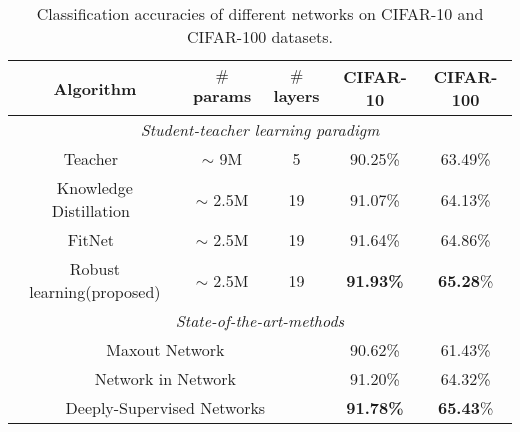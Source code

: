 \documentclass[journal]{IEEEtran}
\begin{document}
\begin{table*}[ht]
\renewcommand\arraystretch{1}
\centering
\small
\setlength{\abovecaptionskip}{0.2cm}
\setlength{\belowcaptionskip}{0.2cm}
\caption{Classification accuracies of different networks on CIFAR-10 and CIFAR-100 datasets.}
\begin{tabular}{|c|c|c|c|c|}
\hline
\textbf{Algorithm}  &  \textbf{$\#$\textbf{params}}  &  \textbf{$\#$\textbf{layers}}  &  \textbf{\textbf{CIFAR-10}}  &  \textbf{\textbf{CIFAR-100}} \\
\hline
\hline
\multicolumn{5}{|c|}{\emph{Student-teacher learning paradigm}} \\
\hline
\hline
Teacher~\cite{goodfellow2013maxout}  &  $\sim$ 9M  &  5  &  90.25\%  &  63.49\%  \\
\hline
Knowledge Distillation~\cite{hinton2015distilling}   &  $\sim$ 2.5M  & 19  &  91.07\%  &  64.13\%  \\
\hline
FitNet~\cite{romero2014fitnets}  &  $\sim$ 2.5M  &  19  &  91.64\%  &  64.86\%  \\
\hline
Robust learning(proposed)  &  $\sim$ 2.5M  &  19  &  \textbf{91.93\%}  &  \textbf{65.28}\%  \\
\hline
\hline
\multicolumn{5}{|c|}{\emph{State-of-the-art-methods}} \\
\hline
\hline
\multicolumn{3}{|c|}{Maxout Network~\cite{goodfellow2013maxout}}  &  90.62\%  &  61.43\% \\
\hline
\multicolumn{3}{|c|}{Network in Network~\cite{lin2013network}}  &  91.20\%  &  64.32\% \\
\hline
\multicolumn{3}{|c|}{Deeply-Supervised Networks~\cite{lee2015deeply} }  &  \textbf{91.78\%}  &  \textbf{65.43}\% \\
\hline
\end{tabular}
\label{tab_cifar}
\end{table*}
\end{document}
